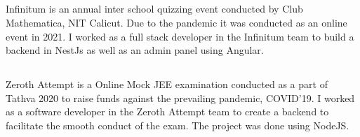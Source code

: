 \documentclass[]{resume}
\begin{document}
\begin{minipage}[t]{0.66\textwidth}
\subsection{\href{https://infinitum.clubmathematica.com/}{}}
\vspace{1mm}
Infinitum is an annual inter school quizzing event conducted by Club Mathematica, NIT Calicut. Due to the pandemic it was conducted as an online event in 2021. I worked as a full stack developer in the Infinitum team to build a backend in NestJs as well as an admin panel using Angular.
\sectionsep

\subsection{\href{http://tathva.org/}{}}
\vspace{1mm}
Zeroth Attempt is a Online Mock JEE examination conducted as a part of Tathva 2020 to raise funds against the prevailing pandemic, COVID'19. I worked as a software developer in the Zeroth Attempt team to create a backend to facilitate the smooth conduct of the exam. The project was done using NodeJS.
\sectionsep

\end{minipage} 
\end{document}
